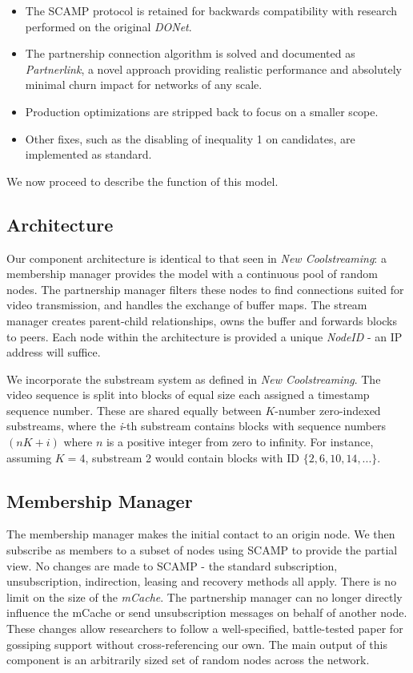 \documentclass[12pt,a4paper]{article}
\begin{document}
\begin{itemize}
	\item The SCAMP protocol is retained for backwards compatibility with research performed on the original \textit{DONet}.
	\item The partnership connection algorithm is solved and documented as \textit{Partnerlink}, a novel approach providing realistic performance and absolutely minimal churn impact for networks of any scale.
	\item Production optimizations are stripped back to focus on a smaller scope.
	\item Other fixes, such as the disabling of inequality 1 on candidates, are implemented as standard.
\end{itemize}

We now proceed to describe the function of this model.

\subsection{Architecture} \label{css:architecture}
Our component architecture is identical to that seen in \textit{New Coolstreaming}: a membership manager provides the model with a continuous pool of random nodes. The partnership manager filters these nodes to find connections suited for video transmission, and handles the exchange of buffer maps. The stream manager creates parent-child relationships, owns the buffer and forwards blocks to peers. Each node within the architecture is provided a unique \textit{NodeID} - an IP address will suffice.

We incorporate the substream system as defined in \textit{New Coolstreaming}. The video sequence is split into blocks of equal size each assigned a timestamp sequence number. These are shared equally between \(K\)-number zero-indexed substreams, where the \textit{i}-th substream contains blocks with sequence numbers \((nK + \textit{i})\) where \(n\) is a positive integer from zero to infinity. For instance, assuming \(K = 4\), substream 2 would contain blocks with ID \(\{2, 6, 10, 14, ...\}\).

\subsection{Membership Manager} \label{css:membership}
The membership manager makes the initial contact to an origin node. We then subscribe as members to a subset of nodes using SCAMP to provide the partial view. No changes are made to SCAMP - the standard subscription, unsubscription, indirection, leasing and recovery methods all apply. There is no limit on the size of the \textit{mCache}. The partnership manager can no longer directly influence the mCache or send unsubscription messages on behalf of another node. These changes allow researchers to follow a well-specified, battle-tested paper for gossiping support without cross-referencing our own. The main output of this component is an arbitrarily sized set of random nodes across the network.
\end{document}

